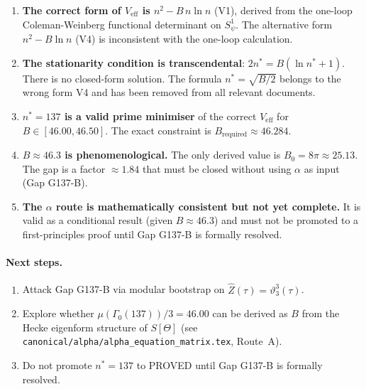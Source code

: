 \documentclass[12pt,a4paper]{article}
\theoremstyle{definition}
\theoremstyle{remark}
\begin{document}
\begin{tcolorbox}[colback=blue!4!white,colframe=blue!50!black,
                  title=Summary of Findings]
\begin{enumerate}
  \item \textbf{The correct form of $V_{\mathrm{eff}}$ is $n^2 - B\,n\ln n$} (V1),
        derived from the one-loop Coleman-Weinberg functional determinant on
        $S^1_\psi$.  The alternative form $n^2 - B\ln n$ (V4) is inconsistent
        with the one-loop calculation.

  \item \textbf{The stationarity condition is transcendental}: $2n^* = B(\ln n^*+1)$.
        There is no closed-form solution.  The formula $n^* = \sqrt{B/2}$
        belongs to the wrong form V4 and has been removed from all relevant
        documents.

  \item \textbf{$n^* = 137$ is a valid prime minimiser} of the correct $V_{\mathrm{eff}}$
        for $B \in [46.00, 46.50]$.  The exact constraint is $B_{\mathrm{required}}
        \approx 46.284$.

  \item \textbf{$B \approx 46.3$ is phenomenological.}  The only derived
        value is $B_0 = 8\pi \approx 25.13$.  The gap is a factor
        $\approx 1.84$ that must be closed without using $\alpha$ as input
        (Gap G137-B).

  \item \textbf{The $\alpha$ route is mathematically consistent but not yet complete.}
        It is valid as a conditional result (given $B \approx 46.3$) and
        must not be promoted to a first-principles proof until Gap G137-B is
        formally resolved.
\end{enumerate}
\end{tcolorbox}

\paragraph{Next steps.}
\begin{enumerate}
  \item Attack Gap G137-B via modular bootstrap on $\hat{Z}(\tau) = \vartheta_3^3(\tau)$.
  \item Explore whether $\mu(\Gamma_0(137))/3 = 46.00$ can be derived as $B$
        from the Hecke eigenform structure of $S[\Theta]$
        (see \texttt{canonical/alpha/alpha\_equation\_matrix.tex}, Route~A).
  \item Do not promote $n^* = 137$ to PROVED until Gap G137-B is formally resolved.
\end{enumerate}

\ifdefined\INCLUDEMODE
\else
  
\end{document}
